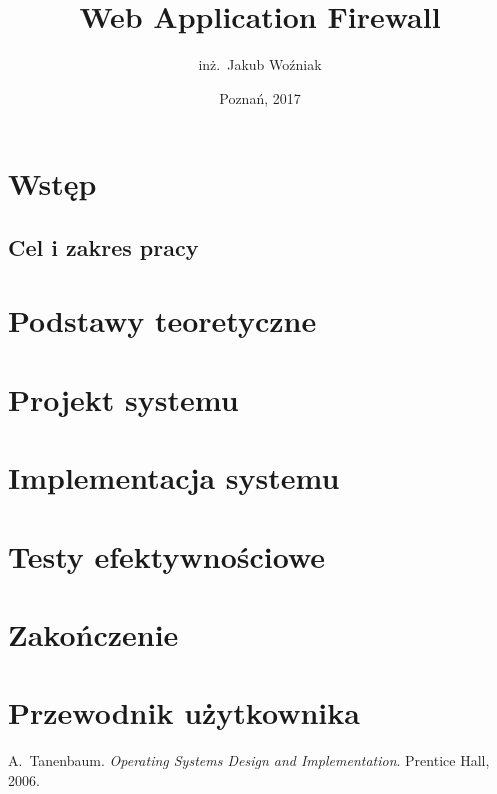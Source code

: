 \documentclass[11pt,a4paper,polish,thesis]{dcsbook}
\begin{document}
\author{inż.~Jakub Woźniak}
\title{Web Application Firewall}
\date{Poznań, 2017}
\maketitle
\frontmatter
\tableofcontents{}
\mainmatter

\chapter{Wstęp}

\section*{Cel i zakres pracy}


\chapter{Podstawy teoretyczne}


\chapter{Projekt systemu}

\chapter{Implementacja systemu}

\chapter{Testy efektywnościowe}

\chapter{Zakończenie}

\appendix

\chapter{Przewodnik użytkownika}

\backmatter

\begin{thebibliography}{1}
A.~Tanenbaum. \emph{Operating Systems Design and Implementation}.
Prentice Hall, 2006.
\end{thebibliography}
\end{document}

